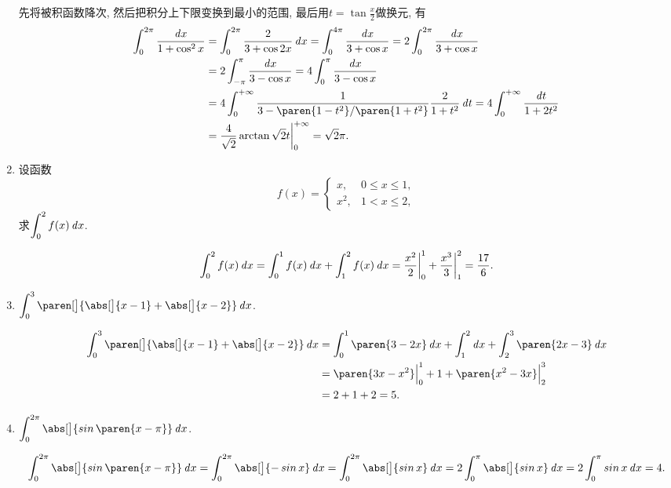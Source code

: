 \begin{enumerate}
  \ifshowsol
    先将被积函数降次, 然后把积分上下限变换到最小的范围, 最后用\(t = \tan \frac x2\)做换元, 有
    \[
      \begin{split}
        \int_0^{2\pi} \frac{\dx}{1 + \cos^2 x}
        &= \int_0^{2\pi} \frac{2}{3 + \cos 2x} \dx
          = \int_0^{4\pi} \frac{\dx}{3 + \cos x}
          = 2 \int_0^{2\pi} \frac{\dx}{3 + \cos x} \\
        &= 2 \int_{-\pi}^{\pi} \frac{\dx}{3 - \cos x}
          = 4 \int_0^{\pi} \frac{\dx}{3 - \cos x} \\
        &= 4 \int_0^{+\infty} \frac{1}{3 - \paren{1-t^2}/\paren{1+t^2}} \frac{2}{1+t^2} \dt
          = 4 \int_0^{+\infty} \frac{\dt}{1 + 2t^2} \\
        &= \frac{4}{\sqrt2} \arctan \sqrt2 t \bigg\vert_0^{+\infty}
          = \sqrt2 \pi.
      \end{split}
    \]
  \fi

\item 设函数
  \[
    f(x) =
    \begin{cases}
      x, & 0 \le x \le 1, \\
      x^2, & 1 < x \le 2,
    \end{cases}
  \]
  求\(\displaystyle \int_0^2 f(x) \mathop{}\!\mathit{d} x\).

  \ifshowsol
    \[
      \int_0^2 f(x) \mathop{}\!\mathit{d} x
      = \int_0^1 f(x) \mathop{}\!\mathit{d} x + \int_1^2 f(x) \mathop{}\!\mathit{d} x
      = \frac{x^2}{2} \bigg\vert_0^1 + \frac{x^3}{3} \bigg\vert_1^2
      = \frac{17}{6}.
    \]
  \fi

\item \(\displaystyle \int_0^3 \paren[\big]{\abs[\big]{x-1} + \abs[\big]{x-2}} \dx\).

  \ifshowsol
    \[
      \begin{split}
        \int_0^3 \paren[\big]{\abs[\big]{x-1} + \abs[\big]{x-2}} \dx
        &= \int_0^1 \paren{3-2x} \dx + \int_1^2 \dx + \int_2^3 \paren{2x-3} \dx \\
        &= \paren{3x-x^2} \Big\vert_0^1 + 1 + \paren{x^2 - 3x} \Big\vert_2^3 \\
        &= 2 + 1 + 2 = 5.
      \end{split}
    \]
  \fi

\item \(\displaystyle \int_0^{2\pi} \abs[\big]{\sin\paren{x-\pi}} \dx\).

  \ifshowsol
    \[
      \int_0^{2\pi} \abs[\big]{\sin\paren{x-\pi}} \dx
      = \int_0^{2\pi} \abs[\big]{- \sin x} \dx
      = \int_0^{2\pi} \abs[\big]{\sin x} \dx
      = 2 \int_0^{\pi} \abs[\big]{\sin x} \dx
      = 2 \int_0^{\pi} \sin x \dx
      = 4.
    \]
  \fi


\end{enumerate}
